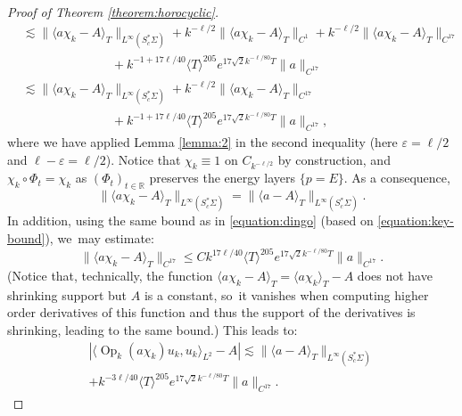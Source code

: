 \documentclass[10pt]{amsart}
\theoremstyle{plain}
\theoremstyle{definition}
\newcommand{\R}{\mathbb{R}}
\let\eps\varepsilon
\DeclareMathOperator{\Op}{Op}
\begin{document}
\begin{proof}[Proof of Theorem \ref{theorem:horocyclic}]
\[\begin{split}
& \lesssim \|\langle a \chi_k-A\rangle_T\|_{L^\infty(S^*_c\Sigma)} + k^{-\ell/2} \|\langle a \chi_k-A\rangle_T\|_{C^{1}} + k^{-\ell/2}\|\langle a \chi_k-A\rangle_T\|_{C^{17}}\\
& \hspace{3cm} + k^{-1+17\ell/40} \langle T\rangle^{205} e^{17\sqrt{2}k^{-\ell/80} T} \|a\|_{C^{17}} \\
& \lesssim \|\langle a \chi_k-A\rangle_T\|_{L^\infty(S^*_c\Sigma)} + k^{-\ell/2}\|\langle a \chi_k-A\rangle_T\|_{C^{17}} \\
& \hspace{3cm}+ k^{-1+17\ell/40} \langle T\rangle^{205} e^{17\sqrt{2}k^{-\ell/80} T} \|a\|_{C^{17}},
\end{split}
\]
where we have applied Lemma \ref{lemma:2} in the second inequality (here $\eps = \ell/2$ and $\ell-\eps=\ell/2$). Notice that $\chi_k \equiv 1$ on $C_{k^{-\ell/2}}$ by construction, and $\chi_k \circ \Phi_t = \chi_k$ as $(\Phi_t)_{t \in \R}$ preserves the energy layers $\{p=E\}$. As a consequence,
\[
\|\langle a \chi_k-A\rangle_T\|_{L^\infty(S^*_c\Sigma)} = \|\langle a-A\rangle_T\|_{L^\infty(S^*_c\Sigma)}.
\]
In addition, using the same bound as in \eqref{equation:dingo} (based on \eqref{equation:key-bound}), we~may estimate:
\[
\|\langle a \chi_k-A\rangle_T\|_{C^{17}} \leq C k^{17\ell/40}\langle T\rangle^{205}e^{17\sqrt{2} k^{-\ell/80} T}\|a\|_{C^{17}}.
\]
(Notice that, technically, the function $\langle a \chi_k-A\rangle_T = \langle a\chi_k\rangle_T - A$ does not have shrinking support but $A$ is a constant, so~it vanishes when computing higher order derivatives of this function and thus the support of the derivatives is shrinking, leading to the same bound.) This leads to:
\begin{multline}
\label{equation:la2}
|\langle \Op_k(a \chi_k) u_k,u_k\rangle_{L^2} - A| \lesssim \|\langle a-A\rangle_T\|_{L^\infty(S^*_c\Sigma)}\\
+ k^{-3\ell/40} \langle T\rangle^{205} e^{17\sqrt{2}k^{-\ell/80} T} \|a\|_{C^{17}}.
\end{multline}


\end{proof}
\end{document}
